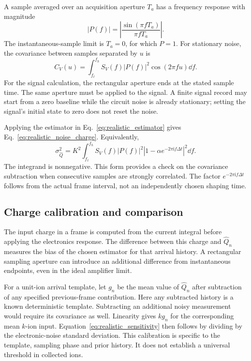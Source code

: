 A sample averaged over an acquisition aperture $T_a$ has a frequency response with magnitude
\begin{equation}
 |P(f)|=\left|\frac{\sin(\pi fT_a)}{\pi fT_a}\right|.
\end{equation}
The instantaneous-sample limit is $T_a=0$, for which $P=1$. For stationary noise, the covariance between samples separated by $u$ is
\begin{equation}
 C_V(u)=\int_{f_{\ell}}^{f_h}S_V(f)|P(f)|^2
 \cos(2\pi fu)\dd f.
 \label{eq:app_realistic_covariance}
\end{equation}
For the signal calculation, the rectangular aperture ends at the stated sample time. The same aperture must be applied to the signal. A finite signal record may start from a zero baseline while the circuit noise is already stationary; setting the signal's initial state to zero does not reset the noise.

Applying the estimator in Eq.~\eqref{eq:realistic_estimator} gives Eq.~\eqref{eq:realistic_noise_charge}. Equivalently,
\begin{equation}
 \sigma_{\widehat Q}^{2}=K^2\int_{f_{\ell}}^{f_h}
 S_V(f)|P(f)|^2\left|1-\alpha e^{-2\pi\mathrm{i}f\Delta t}\right|^2\dd f.
 \label{eq:app_realistic_noise_integral}
\end{equation}
The integrand is nonnegative. This form provides a check on the covariance subtraction when consecutive samples are strongly correlated. The factor $e^{-2\pi\mathrm{i}f\Delta t}$ follows from the actual frame interval, not an independently chosen shaping time.

\subsection{Charge calibration and comparison}

The input charge in a frame is computed from the current integral before applying the electronics response. The difference between this charge and $\widehat Q_n$ measures the bias of the chosen estimator for that arrival history. A rectangular sampling aperture can introduce an additional difference from instantaneous endpoints, even in the ideal amplifier limit.

For a unit-ion arrival template, let $g_n$ be the mean value of $\widehat Q_n$ after subtraction of any specified previous-frame contribution. Here any subtracted history is a known deterministic template. Subtracting an additional noisy measurement would require its covariance as well. Linearity gives $k g_n$ for the corresponding mean $k$-ion input. Equation~\eqref{eq:realistic_sensitivity} then follows by dividing by the electronic-noise standard deviation. This calibration is specific to the template, sampling phase and prior history. It does not establish a universal threshold in collected ions.

